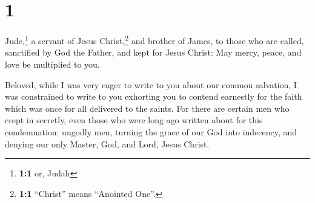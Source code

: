 \hypertarget{section}{%
\section{1}\label{section}}

 Jude,\footnote{\textbf{1:1} or, Judah} a servant of Jesus
Christ,\footnote{\textbf{1:1} ``Christ'' means ``Anointed One''.} and
brother of James, to those who are called, sanctified by God the Father,
and kept for Jesus Christ:  May mercy, peace, and love be
multiplied to you.

 Beloved, while I was very eager to write to you about our
common salvation, I was constrained to write to you exhorting you to
contend earnestly for the faith which was once for all delivered to the
saints.  For there are certain men who crept in secretly,
even those who were long ago written about for this condemnation:
ungodly men, turning the grace of our God into indecency, and denying
our only Master, God, and Lord, Jesus Christ.

